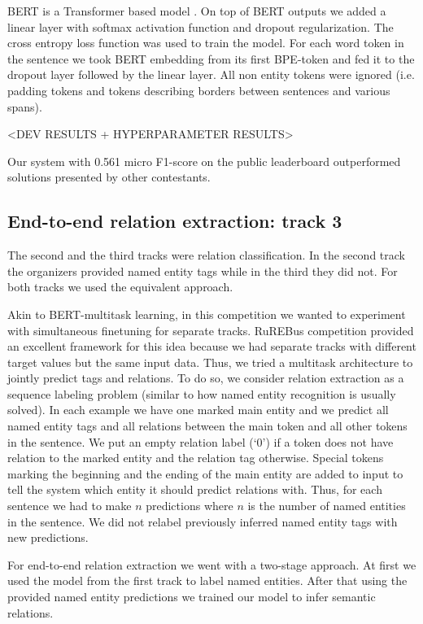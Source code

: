 \documentclass{dialogue}
\begin{document}
BERT is a Transformer based model \cite{attention}. On top of BERT outputs we added a linear layer with softmax activation function and dropout regularization. The cross entropy loss function was used to train the model. For each word token in the sentence we took BERT embedding from its first BPE-token and fed it to the dropout layer followed by the linear layer. All non entity tokens were ignored (i.e. padding tokens and tokens describing borders between sentences and various spans).

<DEV RESULTS + HYPERPARAMETER RESULTS>

Our system with 0.561 micro F1-score on the public leaderboard outperformed solutions presented by other contestants.

\subsection{End-to-end relation extraction: track 3}
The second and the third tracks were relation classification. In the second track the organizers provided named entity tags while in the third they did not. For both tracks we used the equivalent approach.

Akin to BERT-multitask learning, in this competition we wanted to experiment with simultaneous finetuning for separate tracks. RuREBus competition provided an excellent framework for this idea because we had separate tracks with different target values but the same input data. Thus, we tried a multitask architecture to jointly predict tags and relations. To do so, we consider relation extraction as a sequence labeling problem (similar to how named entity recognition is usually solved). In each example we have one marked main entity and we predict all named entity tags and all relations between the main token and all other tokens in the sentence. We put an empty relation label (‘0’) if a token does not have relation to the marked entity and the relation tag otherwise. Special tokens marking the beginning and the ending of the main entity are added to input to tell the system which entity it should predict relations with. Thus, for each sentence we had to make $n$ predictions where $n$ is the number of named entities in the sentence. We did not relabel previously inferred named entity tags with new predictions.

For end-to-end relation extraction we went with a two-stage approach. At first we used the model from the first track to label named entities. After that using the provided named entity predictions we trained our model to infer semantic relations.
\end{document}
